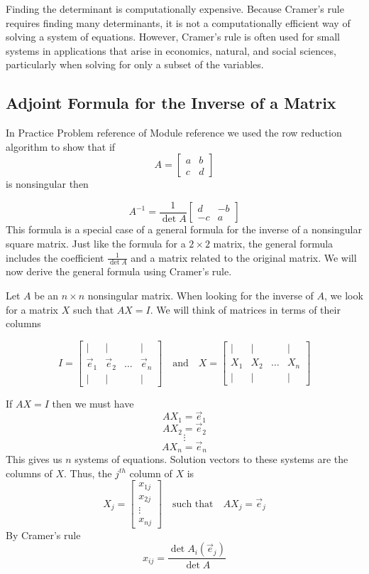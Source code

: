 \documentclass{ximera}
\begin{document}
Finding the determinant is computationally expensive.  Because Cramer's rule requires finding many determinants, it is not a computationally efficient way of solving a system of equations.  However, Cramer's rule is often used for small systems in applications that arise in economics, natural, and social sciences, particularly when solving for only a subset of the variables.

\subsection*{Adjoint Formula for the Inverse of a Matrix}

In Practice Problem {\color{red} reference} of Module {\color{red} reference} we used the row reduction algorithm to show that if $$A=\begin{bmatrix}a&b\\c&d\end{bmatrix}$$ is nonsingular then 

\begin{equation}\label{eq:twobytwoinverse}A^{-1}=\frac{1}{\det{A}}\begin{bmatrix}d&-b\\-c&a\end{bmatrix}\end{equation}
This formula is a special case of a general formula for the inverse of a nonsingular square matrix.  Just like the formula for a $2\times 2$ matrix, the general formula  includes the coefficient $\frac{1}{\det{A}}$ and a matrix related to the original matrix.  We will now derive the general formula using Cramer's rule.

Let $A$ be an $n\times n$ nonsingular matrix.  When looking for the inverse of $A$, we look for a matrix $X$ such that $AX=I$.  We will think of matrices in terms of their columns

$$I=\begin{bmatrix}
           | & |& &|\\
		\vec{e}_1 & \vec{e}_2&\dots&\vec{e}_n\\
		| & |& &|
         \end{bmatrix}\quad\text{and}\quad X=\begin{bmatrix}
           | & |& &|\\
		X_1 & X_2&\dots&X_n\\
		| & |& &|
         \end{bmatrix}$$

If $AX=I$ then we must have
$$AX_1=\vec{e}_1$$
$$AX_2=\vec{e}_2$$
$$\vdots$$
$$AX_n=\vec{e}_n$$
This gives us $n$ systems of equations.  Solution vectors to these systems are the columns of $X$.  Thus, the $j^{th}$ column of $X$ is
$$X_j=\begin{bmatrix}x_{1j}\\x_{2j}\\\vdots\\x_{nj}\end{bmatrix}\quad\text{such that}\quad AX_j=\vec{e}_j$$
By Cramer's rule 
$$x_{ij}=\frac{\det{A_i(\vec{e}_j)}}{\det{A}}$$
         
\end{document}
